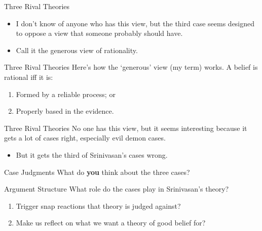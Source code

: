 \documentclass[
  17pt,
  letterpaper,
  ignorenonframetext,
  aspectratio=169,
  handout]{beamer}
\providecommand{\tightlist}{%
  \setlength{\itemsep}{0pt}\setlength{\parskip}{0pt}}\usepackage{longtable,booktabs,array}
\begin{document}
\begin{frame}{Three Rival Theories}
\protect\hypertarget{three-rival-theories-2}{}
\begin{itemize}[<+->]
\tightlist
\item
  I don't know of anyone who has this view, but the third case seems
  designed to oppose a view that someone probably should have.
\item
  Call it the generous view of rationality.
\end{itemize}
\end{frame}

\begin{frame}{Three Rival Theories}
\protect\hypertarget{three-rival-theories-3}{}
Here's how the `generous' view (my term) works. A belief is rational iff
it is:

\begin{enumerate}[<+->]
\tightlist
\item
  Formed by a reliable process; or
\item
  Properly based in the evidence.
\end{enumerate}
\end{frame}

\begin{frame}{Three Rival Theories}
\protect\hypertarget{three-rival-theories-4}{}
No one has this view, but it seems interesting because it gets a lot of
cases right, especially evil demon cases.

\begin{itemize}[<+->]
\tightlist
\item
  But it gets the third of Srinivasan's cases wrong.
\end{itemize}
\end{frame}

\begin{frame}{Case Judgments}
\protect\hypertarget{case-judgments}{}
What do \textbf{you} think about the three cases?
\end{frame}

\begin{frame}{Argument Structure}
\protect\hypertarget{argument-structure}{}
What role do the cases play in Srinivasan's theory?

\begin{enumerate}[<+->]
\tightlist
\item
  Trigger snap reactions that theory is judged against?
\item
  Make us reflect on what we want a theory of good belief for?
\end{enumerate}
\end{frame}
\end{document}
